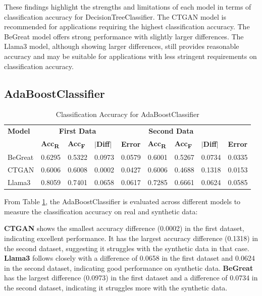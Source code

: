 \vspace{0.5cm}

These findings highlight the strengths and limitations of each model in terms of classification accuracy for DecisionTreeClassifier. The CTGAN model is recommended for applications requiring the highest classification accuracy. The BeGreat model offers strong performance with slightly larger differences. The Llama3 model, although showing larger differences, still provides reasonable accuracy and may be suitable for applications with less stringent requirements on classification accuracy.





\subsection{AdaBoostClassifier}

\begin{table}[H]
\centering
\caption{Classification Accuracy for AdaBoostClassifier}
\label{tab:adaboost_accuracy_combined}
\begin{tabularx}{\textwidth}{l*{8}{X}}
    \toprule
    \textbf{Model} & \multicolumn{3}{c}{\textbf{First Data}} & \multicolumn{4}{c}{\textbf{Second Data}} \\
    \cmidrule(lr){2-4} \cmidrule(lr){5-8}
    & \textbf{Acc\textsubscript{R}} & \textbf{Acc\textsubscript{F}} & \textbf{$|$Diff$|$} & \textbf{Error} & \textbf{Acc\textsubscript{R}} & \textbf{Acc\textsubscript{F}} & \textbf{$|$Diff$|$} & \textbf{Error} \\
    \midrule
    BeGreat & 0.6295 & 0.5322 & 0.0973 & 0.0579 & 0.6001 & 0.5267 & 0.0734 & 0.0335 \\
    CTGAN & 0.6006 & 0.6008 & 0.0002 & 0.0427 & 0.6006 & 0.4688 & 0.1318 & 0.0153 \\
    Llama3 & 0.8059 & 0.7401 & 0.0658 & 0.0617 & 0.7285 & 0.6661 & 0.0624 & 0.0585 \\
    \bottomrule
\end{tabularx}
\end{table}



From Table \ref{tab:adaboost_accuracy_combined}, the AdaBoostClassifier is evaluated across different models to measure the classification accuracy on real and synthetic data:

\textbf{CTGAN} shows the smallest accuracy difference (0.0002) in the first dataset, indicating excellent performance. It has the largest accuracy difference (0.1318) in the second dataset, suggesting it struggles with the synthetic data in that case.
\textbf{Llama3} follows closely with a difference of 0.0658 in the first dataset and 0.0624 in the second dataset, indicating good performance on synthetic data.
\textbf{BeGreat} has the largest difference (0.0973) in the first dataset and a difference of 0.0734 in the second dataset, indicating it struggles more with the synthetic data.

